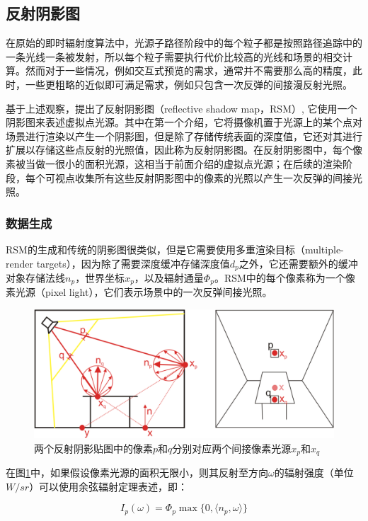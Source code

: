 \subsection{反射阴影图}\label{sec:ir-RSM}
在原始的即时辐射度算法中，光源子路径阶段中的每个粒子都是按照路径追踪中的一条光线一条被发射，所以每个粒子需要执行代价比较高的光线和场景的相交计算。然而对于一些情况，例如交互式预览的需求，通常并不需要那么高的精度，此时，一些更粗略的近似即可满足需求，例如只包含一次反弹的间接漫反射光照。

基于上述观察，\cite{a:ReflectiveShadowMaps}提出了反射阴影图（reflective shadow map，RSM）, 它使用一个阴影图来表述虚拟点光源。其中在第一个介绍，它将摄像机置于光源上的某个点对场景进行渲染以产生一个阴影图，但是除了存储传统表面的深度值，它还对其进行扩展以存储这些点反射的光照值，因此称为反射阴影图。在反射阴影图中，每个像素被当做一很小的面积光源，这相当于前面介绍的虚拟点光源；在后续的渲染阶段，每个可视点收集所有这些反射阴影图中的像素的光照以产生一次反弹的间接光照。




\subsubsection{数据生成}
RSM的生成和传统的阴影图很类似，但是它需要使用多重渲染目标（multiple-render targets），因为除了需要深度缓冲存储深度值$d_p$之外，它还需要额外的缓冲对象存储法线$n_p$，世界坐标$x_p$，以及辐射通量$\Phi_p$。RSM中的每个像素称为一个像素光源（pixel light），它们表示场景中的一次反弹间接光照。

\begin{figure}
\sidecaption
	\includegraphics[width=.65\textwidth]{figures/ir/ir-2-1}	
	\caption{两个反射阴影贴图中的像素$p$和$q$分别对应两个间接像素光源$x_p$和$x_q$}
	\label{f:ir-rsm}
\end{figure}

在图\ref{f:ir-rsm}中，如果假设像素光源的面积无限小，则其反射至方向$\omega$的辐射强度（单位$W/sr$）可以使用余弦辐射定理表述，即：

\begin{equation}\label{e:ir-diffuse-radiant-intensity}
	I_p(\omega)=\Phi_p \max\{ 0,\langle n_p,\omega \rangle \}
\end{equation}

